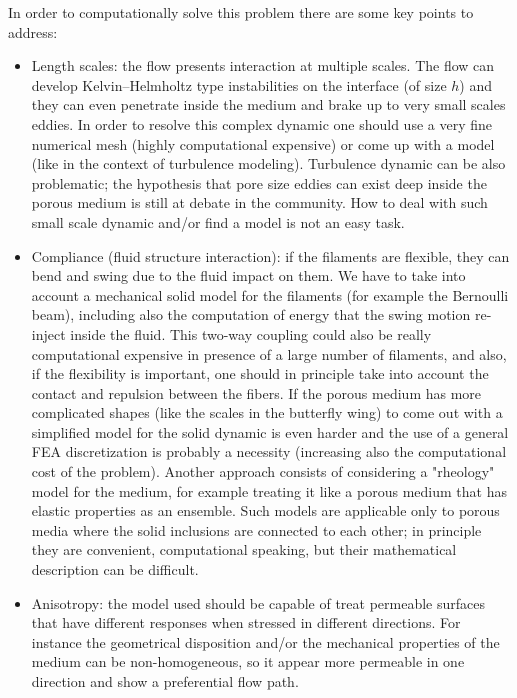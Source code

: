 In order to computationally solve this problem there are some key points to address:
\begin{itemize}
	\item Length scales: the flow presents interaction at multiple scales. The flow can develop Kelvin–Helmholtz type instabilities on the interface (of size $h$) and they can even penetrate inside the medium and brake up to very small scales eddies. In order to resolve this complex dynamic one should use a very fine numerical mesh (highly computational expensive) or come up with a model (like in the context of turbulence modeling).
	Turbulence dynamic can be also problematic; the hypothesis that pore size eddies can exist deep inside the porous medium is still at debate in the community.
	How to deal with such small scale dynamic and/or find a model is not an easy task.
	
	\item Compliance (fluid structure interaction): if the filaments are flexible, they can bend and swing due to the fluid impact on them.
	We have to take into account a mechanical solid model for the filaments (for example the Bernoulli beam), including also the computation of energy that the swing motion re-inject inside the fluid.
	This two-way coupling could also be really computational expensive in presence of a large number of filaments, and also, if the flexibility is important, one should in principle take into account the contact and repulsion between the fibers.
	If the porous medium has more complicated shapes (like the scales in the butterfly wing) to come out with a simplified model for the solid dynamic is even harder and the use of a general FEA discretization is probably a necessity (increasing also the computational cost of the problem).
	Another approach consists of considering a "rheology" model for the medium, for example treating it like a porous medium that has elastic properties as an ensemble.
	Such models are applicable only to porous media where the solid inclusions are connected to each other; in principle they are convenient, computational speaking, but their mathematical description can be difficult.
	
	\item Anisotropy: the model used should be capable of treat permeable surfaces that have different responses when stressed in different directions. For instance the geometrical disposition and/or the mechanical properties of the medium can be non-homogeneous, so it appear more permeable in one direction and show a preferential flow path.
\end{itemize}

